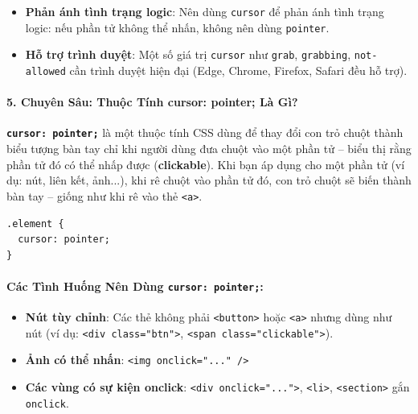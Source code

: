 \documentclass[11pt,oneside]{book}
\newcommand{\codeinline}[1]{\textcolor{accentOrange}{\texttt{#1}}}
\newcommand{\term}[1]{\textbf{\textcolor{primaryBlue}{#1}}}
\begin{document}
\begin{warnBox}
\begin{itemize}[leftmargin=1.5em, itemsep=3pt, parsep=0pt]
    \item \textbf{Phản ánh tình trạng logic}: Nên dùng \codeinline{cursor} để phản ánh tình trạng logic: nếu phần tử không thể nhấn, không nên dùng \codeinline{pointer}.
    \item \textbf{Hỗ trợ trình duyệt}: Một số giá trị \codeinline{cursor} như \codeinline{grab}, \codeinline{grabbing}, \codeinline{not-allowed} cần trình duyệt hiện đại (Edge, Chrome, Firefox, Safari đều hỗ trợ).
\end{itemize}
\end{warnBox}

\paragraph{5. Chuyên Sâu: Thuộc Tính cursor: pointer; Là Gì?}

\begin{conceptBox}
\textbf{\codeinline{cursor: pointer;}} là một thuộc tính CSS dùng để thay đổi con trỏ chuột thành biểu tượng bàn tay chỉ khi người dùng đưa chuột vào một phần tử -- biểu thị rằng phần tử đó có thể nhấp được (\term{clickable}). Khi bạn áp dụng cho một phần tử (ví dụ: nút, liên kết, ảnh...), khi rê chuột vào phần tử đó, con trỏ chuột sẽ biến thành bàn tay -- giống như khi rê vào thẻ \codeinline{<a>}.
\end{conceptBox}

\begin{codeWindow}
\begin{lstlisting}[language=CSS3]
.element {
  cursor: pointer;
}
\end{lstlisting}
\end{codeWindow}

\paragraph{Các Tình Huống Nên Dùng \codeinline{cursor: pointer;}:}
\begin{itemize}[leftmargin=1.5em, itemsep=3pt, parsep=0pt]
    \item \textbf{Nút tùy chỉnh}: Các thẻ không phải \codeinline{<button>} hoặc \codeinline{<a>} nhưng dùng như nút (ví dụ: \codeinline{<div class="btn">}, \codeinline{<span class="clickable">}).
    \item \textbf{Ảnh có thể nhấn}: \codeinline{<img onclick="..." />}
    \item \textbf{Các vùng có sự kiện onclick}: \codeinline{<div onclick="...">}, \codeinline{<li>}, \codeinline{<section>} gắn \codeinline{onclick}.
\end{itemize}
\end{document}
